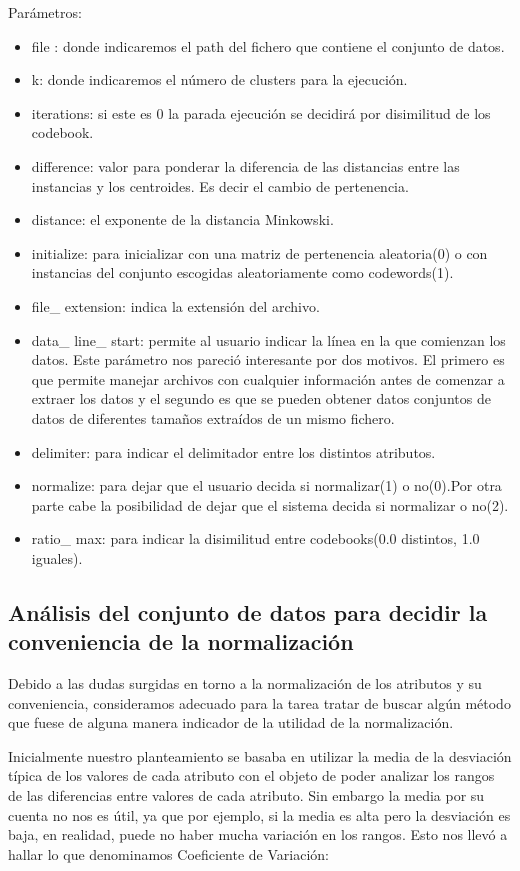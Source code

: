 \documentclass[10pt,a4paper]{article}
\begin{document}
Parámetros:
\begin{itemize}
	\item file : donde indicaremos el path del fichero que contiene el conjunto de datos.
	\item k: donde indicaremos el número de clusters para la ejecución.
	\item iterations: si este es 0 la parada ejecución se decidirá por disimilitud de los codebook.
	\item difference: valor para ponderar la diferencia de las distancias entre las instancias y los centroides. Es decir el cambio de pertenencia.
	\item distance: el exponente de la distancia Minkowski.
	\item initialize: para inicializar con una matriz de pertenencia aleatoria(0) o con instancias del conjunto escogidas aleatoriamente como codewords(1).
	\item file\_ extension: indica la extensión del archivo.
	\item data\_ line\_ start: permite al usuario indicar la línea en la que comienzan los datos. Este parámetro nos pareció interesante por dos motivos. El primero es que permite manejar archivos con cualquier información antes de comenzar a extraer los datos y el segundo es que se pueden obtener datos conjuntos de datos de diferentes tamaños extraídos de un mismo fichero.
	\item delimiter: para indicar el delimitador entre los distintos atributos.
	\item normalize: para dejar que el usuario decida si normalizar(1) o no(0).Por otra parte cabe la posibilidad de dejar que el sistema decida si normalizar o no(2).
	\item ratio\_ max: para indicar la disimilitud entre codebooks(0.0 distintos, 1.0 iguales). 
\end{itemize}  


\subsection{Análisis del conjunto de datos para decidir la conveniencia de la normalización}

Debido a las dudas surgidas en torno a la normalización de los atributos y su conveniencia, consideramos adecuado para la tarea tratar de buscar algún método que fuese
de alguna manera indicador de la utilidad de la normalización.

Inicialmente nuestro planteamiento se basaba en utilizar la media de la desviación típica de los valores de cada atributo con el objeto de poder analizar los rangos 
de las diferencias entre valores de cada atributo. Sin embargo la media por su cuenta no nos es útil, ya que por ejemplo, si la media es alta pero la desviación es baja, 
en realidad, puede no haber mucha variación en los rangos. Esto nos llevó a hallar lo que denominamos Coeficiente de Variación:\\
\end{document}
